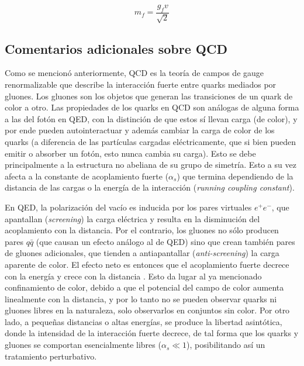 \begin{equation}
m_f = \frac{g_f v}{\sqrt{2}}
\end{equation}





\subsection{Comentarios adicionales sobre QCD}\label{sec:qcd}

Como se mencionó anteriormente, QCD \cite{qcdcollider} es la teoría de campos de gauge renormalizable
que describe la interacción fuerte entre quarks mediados por gluones. Los gluones son los objetos que generan las transiciones de un quark de color a otro. Las propiedades de los quarks en QCD son análogas de alguna forma a las del fotón en QED, con la distinción de que estos sí llevan carga (de color), y por ende pueden autointeractuar y además cambiar la carga  de color de los quarks (a diferencia de las partículas cargadas eléctricamente, que si bien pueden emitir o absorber un fotón, esto nunca cambia su carga). Esto se debe principalmente a la estructura no abeliana de su grupo de simetría.
Esto a su vez afecta a la constante de acoplamiento fuerte ($\alpha_s$) que termina dependiendo de la distancia de las cargas o la energía de la interacción (\textit{running coupling constant}). 

En QED, la polarización del vacío es inducida por los
pares virtuales $e^{+}e^{-}$, que apantallan (\textit{screening}) la carga eléctrica y resulta en la disminución del
acoplamiento con la distancia. Por el contrario, los gluones no sólo producen pares $q\bar{q}$ (que
causan un efecto análogo al de QED) sino que crean también pares de gluones adicionales,
que tienden a antiapantallar (\textit{anti-screening}) la carga aparente de color. El efecto neto es entonces que
el acoplamiento fuerte decrece con la energía y crece con la distancia . Esto da lugar al ya mencionado confinamiento de color, debido a que el potencial del campo de color aumenta linealmente con la distancia, y por lo tanto no se pueden observar quarks ni gluones libres en la naturaleza, solo observarlos en conjuntos sin color. Por otro lado, a pequeñas distancias o altas energías, se produce la libertad asintótica, donde la intensidad de
la interacción fuerte decrece, de tal forma que los quarks y gluones se comportan
esencialmente libres ($\alpha_s \ll 1$), posibilitando así un tratamiento perturbativo. 

